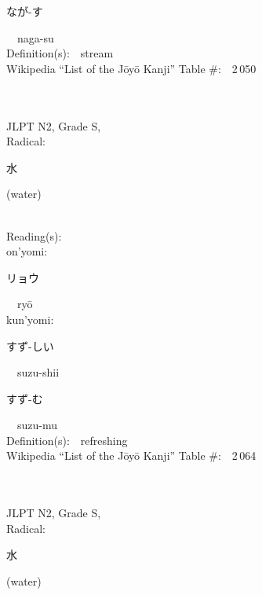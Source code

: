 \begin{multicols}{2}
{\hspace*{2em}}{\begin{CJK}{UTF8}{min} なが-す \end{CJK}}\ \ naga-su\ \ \\
Definition(s):\ \ stream \\
Wikipedia ``List of the J\=oy\=o Kanji'' Table \#:\ \ 2\,050 \\
\ \ \\
{\fontsize{34pt}{40pt}  }\ \ \\  %
{JLPT N2, Grade S, \\Radical:\ \ {\begin{CJK}{UTF8}{min} 水 \end{CJK}} (water) } \\
Reading(s):\ \ \\
{\hspace*{1em}}on'yomi:\ \ \\
{\hspace*{2em}}{\begin{CJK}{UTF8}{min} リョウ \end{CJK}}\ \ ry\=o\ \ \\
{\hspace*{1em}}kun'yomi:\ \ \\
{\hspace*{2em}}{\begin{CJK}{UTF8}{min} すず-しい \end{CJK}}\ \ suzu-shii\ \ \\
{\hspace*{2em}}{\begin{CJK}{UTF8}{min} すず-む \end{CJK}}\ \ suzu-mu\ \ \\
Definition(s):\ \ refreshing \\
Wikipedia ``List of the J\=oy\=o Kanji'' Table \#:\ \ 2\,064 \\
\ \ \\
{\fontsize{34pt}{40pt}  }\ \ \\  %
{JLPT N2, Grade S, \\Radical:\ \ {\begin{CJK}{UTF8}{min} 水 \end{CJK}} (water) } \\

\end{multicols}
